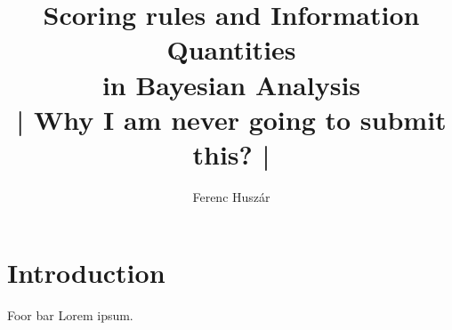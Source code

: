 \documentclass[12pt]{book}
\title{Scoring rules and Information Quantities\\in Bayesian Analysis \\ | Why I am never going to submit this? |}
\author{Ferenc Husz\'{a}r}
\begin{document}
\maketitle

\tableofcontents
\chapter{Introduction}
Foor bar Lorem ipsum.






\end{document}
